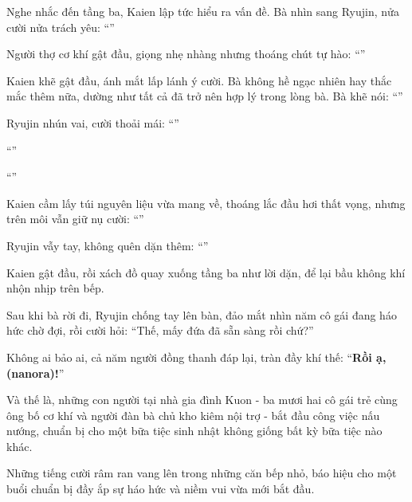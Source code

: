 \documentclass[../main.tex]{subfiles}
\begin{document}
Nghe nhắc đến tầng ba, Kaien lập tức hiểu ra vấn đề. Bà nhìn sang Ryujin, nửa cười nửa trách yêu: ``''

Người thợ cơ khí gật đầu, giọng nhẹ nhàng nhưng thoáng chút tự hào: ``''

Kaien khẽ gật đầu, ánh mắt lấp lánh ý cười. Bà không hề ngạc nhiên hay thắc mắc thêm nữa, dường như tất cả đã trở nên hợp lý trong lòng bà. Bà khẽ nói: ``''

Ryujin nhún vai, cười thoải mái: ``''

``''

``''

Kaien cầm lấy túi nguyên liệu vừa mang về, thoáng lắc đầu hơi thất vọng, nhưng trên môi vẫn giữ nụ cười: ``''

Ryujin vẫy tay, không quên dặn thêm: ``''

Kaien gật đầu, rồi xách đồ quay xuống tầng ba như lời dặn, để lại bầu không khí nhộn nhịp trên bếp.

Sau khi bà rời đi, Ryujin chống tay lên bàn, đảo mắt nhìn năm cô gái đang háo hức chờ đợi, rồi cười hỏi: ``Thế, mấy đứa đã sẵn sàng rồi chứ?''

Không ai bảo ai, cả năm người đồng thanh đáp lại, tràn đầy khí thế: ``\textbf{Rồi ạ, (nanora)!}''

Và thế là, những con người tại nhà gia đình Kuon - ba mươi hai cô gái trẻ cùng ông bố cơ khí và người đàn bà chủ kho kiêm nội trợ - bắt đầu công việc nấu nướng, chuẩn bị cho một bữa tiệc sinh nhật không giống bất kỳ bữa tiệc nào khác.

Những tiếng cười râm ran vang lên trong những căn bếp nhỏ, báo hiệu cho một buổi chuẩn bị đầy ắp sự háo hức và niềm vui vừa mới bắt đầu.

\il

\subsubsection*{\label{P4.1a}}
\end{document}
